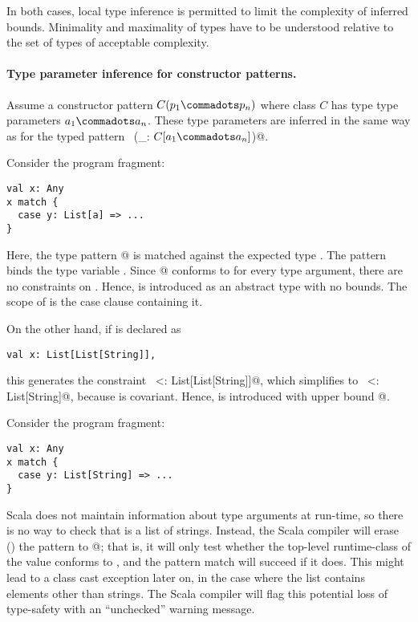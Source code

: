 In both cases, local type inference is permitted to limit the
complexity of inferred bounds. Minimality and maximality of types have
to be understood relative to the set of types of acceptable
complexity.

\paragraph{Type parameter inference for constructor patterns.}
Assume a constructor pattern $C(p_1 \commadots p_n)$ where class $C$
has type type parameters $a_1 \commadots a_n$.  These type parameters
are inferred in the same way as for the typed pattern
~\lstinline@(_: $C[a_1 \commadots a_n]$)@.

\example
Consider the program fragment:
\begin{lstlisting}
val x: Any
x match {
  case y: List[a] => ...
}
\end{lstlisting}
Here, the type pattern \lstinline@List[a]@ is matched against the
expected type \lstinline@Any@. The pattern binds the type variable
\lstinline@a@.  Since \lstinline@List[a]@ conforms to \lstinline@Any@
for every type argument, there are no constraints on \lstinline@a@.
Hence, \lstinline@a@ is introduced as an abstract type with no
bounds. The scope of \lstinline@a@ is the case clause containing it.

On the other hand, if \lstinline@x@ is declared as
\begin{lstlisting}
val x: List[List[String]],
\end{lstlisting}
this generates the constraint 
~\lstinline@List[a] <: List[List[String]]@, which simplifies to 
~\lstinline@a <: List[String]@, because \lstinline@List@ is covariant. Hence,
\lstinline@a@ is introduced with upper bound
\lstinline@List[String]@.

\example
Consider the program fragment: 
\begin{lstlisting}
val x: Any
x match {
  case y: List[String] => ...
}
\end{lstlisting}
Scala does not maintain information about type arguments at run-time,
so there is no way to check that \lstinline@x@ is a list of strings.
Instead, the Scala compiler will erase () the
pattern to \lstinline@List[_]@; that is, it will only test whether the
top-level runtime-class of the value \lstinline@x@ conforms to
\lstinline@List@, and the pattern match will succeed if it does.  This
might lead to a class cast exception later on, in the case where the
list \lstinline@x@ contains elements other than strings.  The Scala
compiler will flag this potential loss of type-safety with an
``unchecked'' warning message.

